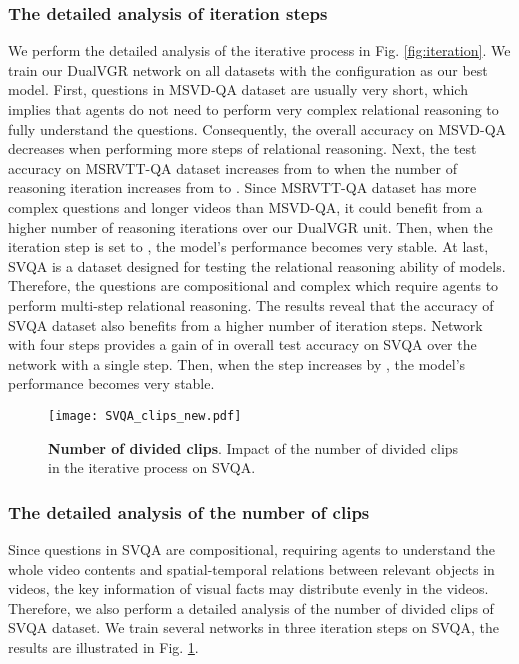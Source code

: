 \documentclass[journal]{IEEEtran}
\begin{document}
\subsubsection{The detailed analysis of iteration steps }
We perform the detailed analysis of the iterative process in Fig. \ref{fig:iteration}. We train our DualVGR network on all datasets with the configuration as our best model. First, questions in MSVD-QA dataset are usually very short, which implies that agents do not need to perform very complex relational reasoning to fully understand the questions. Consequently, the overall accuracy on MSVD-QA decreases when performing more steps of relational reasoning. Next, the test accuracy on MSRVTT-QA dataset increases from  to  when the number of reasoning iteration increases from  to . Since MSRVTT-QA dataset has more complex questions and longer videos than MSVD-QA, it could benefit from a higher number of reasoning iterations over our DualVGR unit. Then, when the iteration step is set to , the model's performance becomes very stable. At last, SVQA is a dataset designed for testing the relational reasoning ability of models. Therefore, the questions are compositional and complex which require agents to perform multi-step relational reasoning. The results reveal that the accuracy of SVQA dataset also benefits from a higher number of iteration steps. Network with four steps provides a gain of  in overall test accuracy on SVQA over the network with a single step. Then, when the step increases by , the model's performance becomes very stable. 
\begin{figure}[t]
    \centering
    \texttt{[image: SVQA\_clips\_new.pdf]}
    \caption{\textbf{Number of divided clips}. Impact of the number of divided clips in the iterative process on SVQA.}
    \label{fig:SVQA_clip}
\end{figure}
\subsubsection{The detailed analysis of the number of clips } 
Since questions in SVQA are compositional, requiring agents to understand the whole video contents and spatial-temporal relations between relevant objects in videos, the key information of visual facts may distribute evenly in the videos. Therefore, we also perform a detailed analysis of the number of divided clips  of SVQA dataset. We train several networks in three iteration steps on SVQA, the results are illustrated in Fig. \ref{fig:SVQA_clip}.
\end{document}
